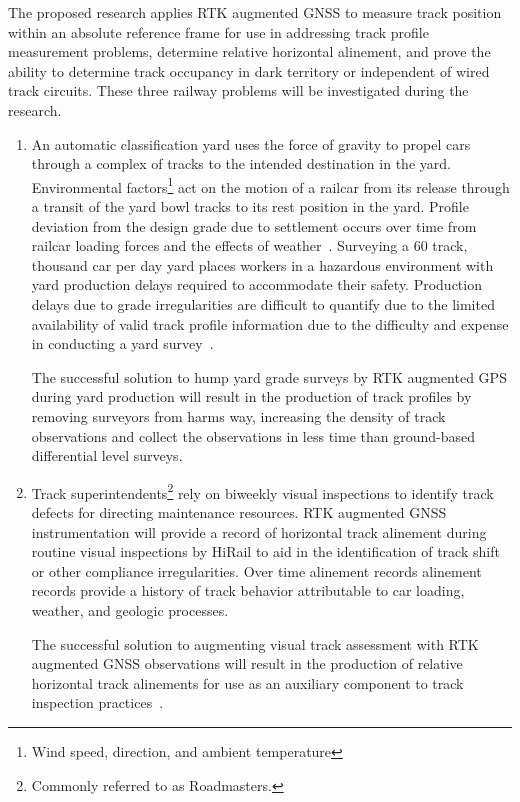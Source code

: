 The proposed research applies RTK augmented GNSS to measure track position within an absolute reference frame for use in addressing track profile measurement problems, determine relative horizontal alinement, and prove the ability to determine track occupancy in dark territory or independent of wired track circuits. These three railway problems will be investigated during the research. 
\begin{enumerate}[1)]
\firmlist
	\item An automatic classification yard uses the force of gravity to propel cars through a complex of tracks to the intended destination in the yard. Environmental factors\footnote{Wind speed, direction, and ambient temperature} act on the motion of a railcar from its release through a transit of the yard bowl tracks to its rest position in the yard. Profile deviation from the design grade due to settlement occurs over time from railcar loading forces and the effects of weather~\citep{2005szwilski_kerchof}. Surveying a 60 track, thousand car per day yard places workers in a hazardous environment with yard production delays required to accommodate their safety. Production delays due to grade irregularities are difficult to quantify due to the limited availability of valid track profile information due to the difficulty and expense in conducting a yard survey~\citep{2007barnes}. 
	
	The successful solution to hump yard grade surveys by RTK augmented GPS during yard production will result in the production of track profiles by removing surveyors from harms way, increasing the density of track observations and collect the observations in less time than ground-based differential level surveys.
	
	\item Track superintendents\footnote{Commonly referred to as Roadmasters.} rely on biweekly visual inspections to identify track defects for directing maintenance resources. RTK augmented GNSS instrumentation will provide a record of horizontal track alinement during routine visual inspections by HiRail to aid in the identification of track shift or other compliance irregularities. Over time alinement records alinement records provide a history of track behavior attributable to car loading, weather, and geologic processes.
	
	The successful solution to augmenting visual track assessment with RTK augmented GNSS observations will result in the production of relative horizontal track alinements for use as an auxiliary component to track inspection practices~\citep{49CFR213D,2007FRATrack,2009bright.rtrack}.
	

\end{enumerate}
